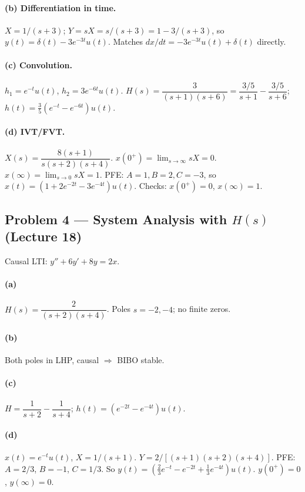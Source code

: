 \documentclass[11pt]{article}
\begin{document}
\paragraph{(b) Differentiation in time.} $X = 1/(s+3)$; $Y = sX = s/(s+3) = 1 - 3/(s+3)$, so $y(t) = \delta(t) - 3e^{-3t}u(t)$. Matches $dx/dt = -3e^{-3t}u(t) + \delta(t)$ directly.

\paragraph{(c) Convolution.} $h_1 = e^{-t}u(t)$, $h_2 = 3e^{-6t}u(t)$. $H(s) = \dfrac{3}{(s+1)(s+6)} = \dfrac{3/5}{s+1} - \dfrac{3/5}{s+6}$; $h(t) = \tfrac{3}{5}(e^{-t}-e^{-6t})u(t)$.

\paragraph{(d) IVT/FVT.} $X(s) = \dfrac{8(s+1)}{s(s+2)(s+4)}$.
$x(0^+) = \lim_{s\to\infty} sX = 0$. $x(\infty) = \lim_{s\to 0} sX = 1$. PFE: $A=1, B=2, C=-3$, so $x(t) = (1 + 2e^{-2t} - 3e^{-4t})u(t)$. Checks: $x(0^+) = 0$, $x(\infty) = 1$.

\subsection{Problem 4 --- System Analysis with $H(s)$ (Lecture 18)}
Causal LTI: $y'' + 6 y' + 8 y = 2x$.

\paragraph{(a)} $H(s) = \dfrac{2}{(s+2)(s+4)}$. Poles $s=-2,-4$; no finite zeros.

\paragraph{(b)} Both poles in LHP, causal $\Rightarrow$ BIBO stable.

\paragraph{(c)} $H = \dfrac{1}{s+2} - \dfrac{1}{s+4}$; $h(t) = (e^{-2t}-e^{-4t})u(t)$.

\paragraph{(d)} $x(t)=e^{-t}u(t)$, $X = 1/(s+1)$. $Y = 2/[(s+1)(s+2)(s+4)]$. PFE: $A = 2/3$, $B = -1$, $C = 1/3$. So $y(t) = (\tfrac{2}{3}e^{-t}-e^{-2t}+\tfrac{1}{3}e^{-4t})u(t)$. $y(0^+)=0$, $y(\infty)=0$.
\end{document}
